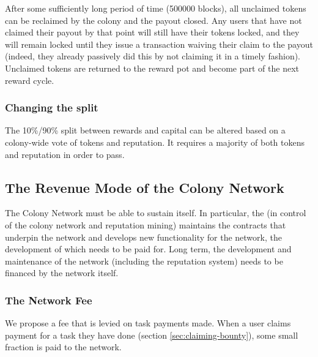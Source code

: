 After some sufficiently long period of time (500000 blocks), all unclaimed tokens can be reclaimed by the colony and the payout closed. Any users that have not claimed their payout by that point will still have their tokens locked, and they will remain locked until they issue a transaction waiving their claim to the payout (indeed, they already passively did this by not claiming it in a timely fashion). Unclaimed tokens are returned to the reward pot and become part of the next reward cycle.


\subsubsection{Changing the split}

The 10\%/90\% split between rewards and capital can be altered based on a colony-wide vote of tokens and reputation. It requires a majority of both tokens and reputation in order to pass.




\subsection{The Revenue Mode of the Colony Network}\label{sec:networkrevenue}
The Colony Network must be able to sustain itself. In particular, the \rc (in control of the colony network and reputation mining) maintains the contracts that underpin the network and develops new functionality for the network, the development of which needs to be paid for. Long term, the development and maintenance of the network (including the reputation system) needs to be financed by the network itself. 

\subsubsection{The Network Fee}\label{sec:networkfee}
We propose a fee that is levied on task payments made. When a user claims payment for a task they have done (section \ref{sec:claiming-bounty}), some small fraction is paid to the network. 

